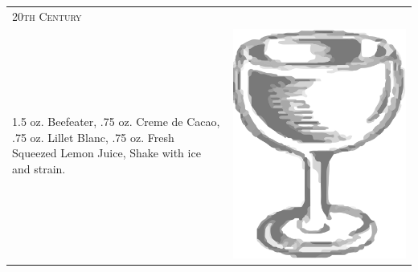\documentclass{article}
\begin{document}
\begin{multicols}{2}
\begin{tabular}{p{2in} p{0.5in}}
\multicolumn{2}{p{3in}}{\centering\Huge\textsc{20th Century}}\\ 
  \vspace{-0.1in} 1.5 oz. Beefeater, .75 oz. Creme de Cacao, .75 oz. Lillet Blanc, .75 oz. Fresh Squeezed Lemon Juice, Shake with ice and strain. &
  \vspace{-0.1in} \includegraphics{coupe.png}
\end{tabular}


\end{multicols}
\end{document}
